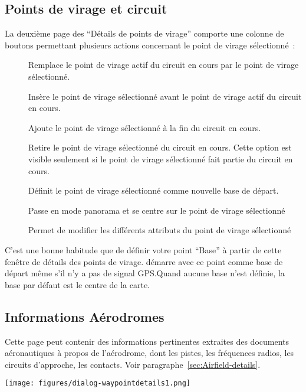 \subsection*{Points de virage et circuit}
La deuxième page des ``Détails de points de virage''
comporte une colonne de boutons permettant plusieurs actions concernant le point de virage sélectionné~:
\begin{description}
\item[] Remplace le point de virage actif du circuit en cours par le point de virage sélectionné.
\item[] Insère le point de virage sélectionné avant le point de virage actif du circuit en cours.
\item[] Ajoute le point de virage sélectionné à la fin du circuit en cours.
\item[] Retire le point de virage sélectionné du circuit en cours. Cette option est visible seulement si le point de virage sélectionné fait partie du circuit en cours.
\item[] Définit le point de virage sélectionné comme nouvelle base de départ.
\item[] Passe en mode panorama et se centre sur le point de virage sélectionné
\item[] %
\item[] %
\item[] Permet de modifier les différents attributs du point de virage sélectionné
\end{description}

C'est une bonne habitude que de définir votre point ``Base'' à partir de cette fenêtre de détails
des points de virage. \xc{} démarre avec ce point comme base de départ même s'il
n'y a pas de signal GPS.\@ Quand aucune base n'est définie, la base par défaut est le centre de la carte.

\subsection*{Informations Aérodromes}
Cette page peut contenir des informations pertinentes
extraites des documents aéronautiques
à propos de l'aérodrome, dont les pistes, les fréquences radios, les circuits d'approche, les contacts.
Voir paragraphe~\ref{sec:Airfield-details}.
\begin{center}
\texttt{[image: figures/dialog-waypointdetails1.png]}
\end{center}


